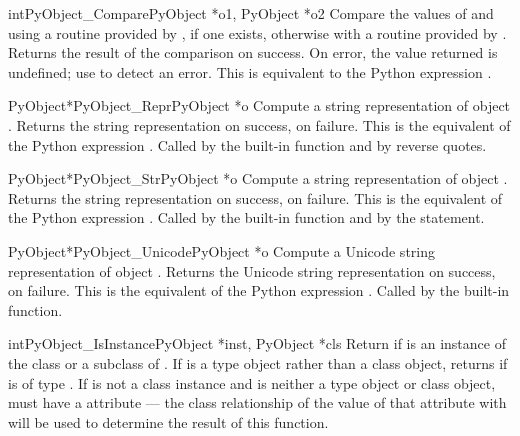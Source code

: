 \begin{cfuncdesc}{int}{PyObject_Compare}{PyObject *o1, PyObject *o2}
  Compare the values of  and  using a routine provided
  by , if one exists, otherwise with a routine provided by
  .  Returns the result of the comparison on success.  On
  error, the value returned is undefined; use
   to detect an error.  This is equivalent
  to the Python expression .
\end{cfuncdesc}


\begin{cfuncdesc}{PyObject*}{PyObject_Repr}{PyObject *o}
  Compute a string representation of object .  Returns the
  string representation on success, \NULL{} on failure.  This is the
  equivalent of the Python expression .  Called by
  the  built-in function and by
  reverse quotes.
\end{cfuncdesc}


\begin{cfuncdesc}{PyObject*}{PyObject_Str}{PyObject *o}
  Compute a string representation of object .  Returns the
  string representation on success, \NULL{} on failure.  This is the
  equivalent of the Python expression .  Called by
  the  built-in function and by the
   statement.
\end{cfuncdesc}


\begin{cfuncdesc}{PyObject*}{PyObject_Unicode}{PyObject *o}
  Compute a Unicode string representation of object .  Returns
  the Unicode string representation on success, \NULL{} on failure.
  This is the equivalent of the Python expression
  .  Called by the
   built-in function.
\end{cfuncdesc}

\begin{cfuncdesc}{int}{PyObject_IsInstance}{PyObject *inst, PyObject *cls}
  Return  if  is an instance of the class 
  or a subclass of .  If  is a type object rather
  than a class object,  returns
   if  is of type .  If  is not a
  class instance and  is neither a type object or class
  object,  must have a  attribute --- the
  class relationship of the value of that attribute with 
  will be used to determine the result of this function.
\end{cfuncdesc}

